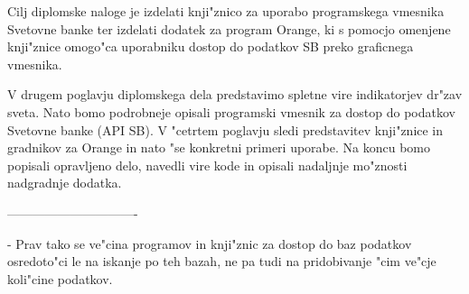 Cilj diplomske naloge je izdelati knji"znico za uporabo programskega vmesnika
Svetovne banke ter izdelati dodatek za program Orange, ki s pomocjo omenjene
knji"znice omogo"ca uporabniku dostop do podatkov SB preko graficnega vmesnika.


V drugem poglavju diplomskega dela predstavimo spletne vire indikatorjev
dr"zav sveta. Nato bomo podrobneje opisali programski vmesnik za dostop do 
podatkov Svetovne banke (API SB). V "cetrtem poglavju sledi predstavitev 
knji"znice in gradnikov za Orange in nato "se konkretni primeri uporabe. Na koncu
bomo popisali opravljeno delo, navedli vire kode in opisali nadaljnje mo"znosti
nadgradnje dodatka.










                                                                                
                                                                                
                         

-------------------------------

 - Prav tako se ve"cina programov in knji"znic za dostop do baz podatkov osredoto"ci le na iskanje po teh bazah, ne pa tudi na pridobivanje "cim ve"cje koli"cine podatkov.                                    
                                                                                

                                                                                

